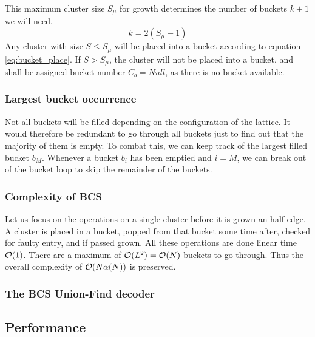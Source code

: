 This maximum cluster size $S_\mu$ for growth determines the number of buckets $k + 1$ we will need.
\begin{equation}\label{eq:bucket_numbuckets}
  k = 2(S_\mu-1)
\end{equation}
Any cluster with size $S\leq S_\mu$ will be placed into a bucket according to equation \eqref{eq:bucket_place}. If $S>S_\mu$, the cluster will not be placed into a bucket, and shall be assigned bucket number $C_b=Null$, as there is no bucket available.



\subsubsection{Largest bucket occurrence}
Not all buckets will be filled depending on the configuration of the lattice. It would therefore be redundant to go through all buckets just to find out that the majority of them is empty. To combat this, we can keep track of the largest filled bucket $b_M$. Whenever a bucket $b_i$ has been emptied and $i = M$, we can break out of the bucket loop to skip the remainder of the buckets.

\subsubsection{Complexity of BCS}
Let us focus on the operations on a single cluster before it is grown an half-edge. A cluster is placed in a bucket, popped from that bucket some time after, checked for faulty entry, and if passed grown. All these operations are done linear time $\mathcal{O}(1)$. There are a maximum of $\mathcal{O}(L^2) = \mathcal{O}(N)$ buckets to go through. Thus the overall complexity of $\mathcal{O}(N\alpha(N))$ is preserved.

\subsubsection{The BCS Union-Find decoder}



\subsection{Performance}
